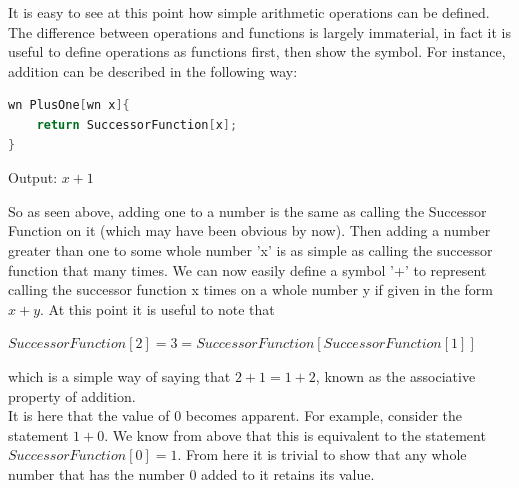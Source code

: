 It is easy to see at this point how simple arithmetic operations can be defined. The difference between operations and functions is largely immaterial, in fact it is useful to define operations as functions first, then show the symbol. For instance, addition can be described in the following way:
\begin{center}
\begin{lstlisting}[language=C,caption=Addition Function,label=lst:addFunc]
wn PlusOne[wn x]{
	return SuccessorFunction[x];
}
\end{lstlisting}
Output: $x+1$
\end{center}
So as seen above, adding one to a number is the same as calling the Successor Function on it (which may have been obvious by now). Then adding a number greater than one to some whole number 'x' is as simple as calling the successor function that many times. We can now easily define a symbol '+' to represent calling the successor function x times on a whole number y if given in the form $x+y$. At this point it is useful to note that
\begin{center}
$SuccessorFunction[2]=3=SuccessorFunction[SuccessorFunction[1]]$
\end{center}
which is a simple way of saying that $2+1=1+2$, known as the associative property of addition. \\
It is here that the value of $0$ becomes apparent. For example, consider the statement $1+0$. We know from above that this is equivalent to the statement $SuccessorFunction[0]=1$. From here it is trivial to show that any whole number that has the number $0$ added to it retains its value.

